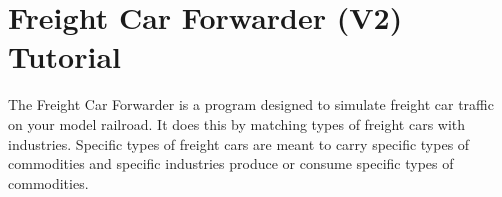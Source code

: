 
\chapter{Freight Car Forwarder (V2) Tutorial}
\label{chpt:fcf:Tutorial}


 The Freight Car Forwarder is a
program designed to simulate freight car traffic on your model
railroad.  It does this by matching types of freight cars with
industries.  Specific types of freight cars are meant to carry specific
types of commodities and specific industries produce or consume
specific types of commodities.

